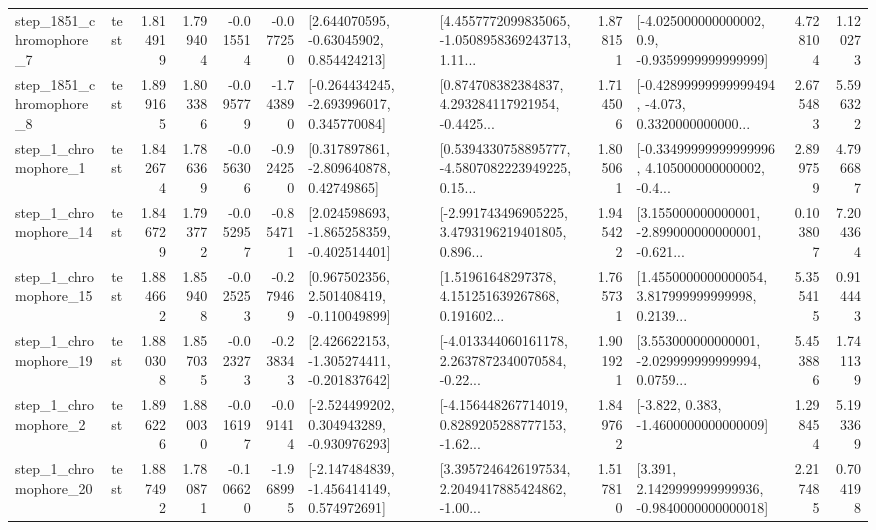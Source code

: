\begin{tabular}{llrrrrllrlrr}
  step\_1851\_chromophore\_7 &      test &      1.814919 &    1.799404 &     -0.015514 & -0.077250 &     [2.644070595, -0.63045902, 0.854424213] &  [4.4557772099835065, -1.0508958369243713, 1.11... &       1.878151 &     [-4.025000000000002, 0.9, -0.9359999999999999] &            4.728104 &          1.120273 \\
  step\_1851\_chromophore\_8 &      test &      1.899165 &    1.803386 &     -0.095779 & -1.743890 &   [-0.264434245, -2.693996017, 0.345770084] &  [0.874708382384837, 4.293284117921954, -0.4425... &       1.714506 &  [-0.42899999999999494, -4.073, 0.3320000000000... &            2.675483 &          5.596322 \\
     step\_1\_chromophore\_1 &      test &      1.842674 &    1.786369 &     -0.056306 & -0.924250 &     [0.317897861, -2.809640878, 0.42749865] &  [0.5394330758895777, -4.5807082223949225, 0.15... &       1.805061 &  [-0.33499999999999996, 4.105000000000002, -0.4... &            2.899759 &          4.796687 \\
    step\_1\_chromophore\_14 &      test &      1.846729 &    1.793772 &     -0.052957 & -0.854711 &   [2.024598693, -1.865258359, -0.402514401] &  [-2.991743496905225, 3.4793196219401805, 0.896... &       1.945422 &  [3.155000000000001, -2.899000000000001, -0.621... &            0.103807 &          7.204364 \\
    step\_1\_chromophore\_15 &      test &      1.884662 &    1.859408 &     -0.025253 & -0.279469 &    [0.967502356, 2.501408419, -0.110049899] &  [1.51961648297378, 4.151251639267868, 0.191602... &       1.765731 &  [1.4550000000000054, 3.817999999999998, 0.2139... &            5.355415 &          0.914443 \\
    step\_1\_chromophore\_19 &      test &      1.880308 &    1.857035 &     -0.023273 & -0.238343 &   [2.426622153, -1.305274411, -0.201837642] &  [-4.013344060161178, 2.2637872340070584, -0.22... &       1.901921 &  [3.553000000000001, -2.029999999999994, 0.0759... &            5.453886 &          1.741139 \\
     step\_1\_chromophore\_2 &      test &      1.896226 &    1.880030 &     -0.016197 & -0.091414 &   [-2.524499202, 0.304943289, -0.930976293] &  [-4.156448267714019, 0.8289205288777153, -1.62... &       1.849762 &               [-3.822, 0.383, -1.4600000000000009] &            1.298454 &          5.193369 \\
    step\_1\_chromophore\_20 &      test &      1.887492 &    1.780871 &     -0.106620 & -1.968995 &   [-2.147484839, -1.456414149, 0.574972691] &  [3.3957246426197534, 2.2049417885424862, -1.00... &       1.517810 &   [3.391, 2.1429999999999936, -0.9840000000000018] &            2.217485 &          0.704198 \\

\end{tabular}
